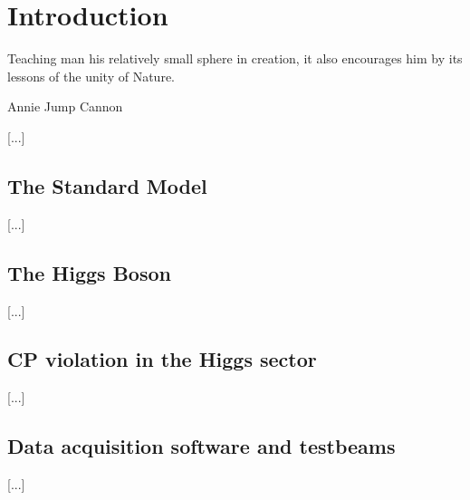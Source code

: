 \chapter{Introduction}


\epigraph{Teaching man his relatively small sphere in creation, it also encourages him by its lessons of the unity of Nature.}{Annie Jump Cannon}{\setlength{\epigraphwidth}{.25\textwidth}}

[...]

\section{The Standard Model}
[...]

\section{The Higgs Boson}
[...]

\section{CP violation in the Higgs sector}
[...]

\section{Data acquisition software and testbeams}
[...]